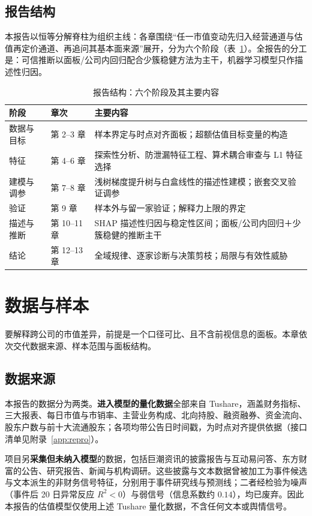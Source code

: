\documentclass[UTF8, a4paper, fontset=none, zihao=-4]{ctexrep}
\begin{document}
\section{报告结构}
本报告以恒等分解脊柱为组织主线：各章围绕“任一市值变动先归入经营通道与估值再定价通道、再追问其基本面来源”展开，分为六个阶段（表~\ref{tab:roadmap}）。全报告的分工是：可信推断以面板/公司内回归配合少簇稳健方法为主干，机器学习模型只作描述性归因。

\begin{table}[htbp]
\caption{报告结构：六个阶段及其主要内容}
\label{tab:roadmap}
\renewcommand{\arraystretch}{1.35}
\begin{tabularx}{\textwidth}{@{}l l X@{}}
\toprule
\textbf{\color{brandblue}阶段} & \textbf{\color{brandblue}章次} & \textbf{\color{brandblue}主要内容} \\
\midrule
数据与目标 & 第 2--3 章 & 样本界定与时点对齐面板；超额估值目标变量的构造 \\
特征 & 第 4--6 章 & 探索性分析、防泄漏特征工程、算术耦合审查与 L1 特征选择 \\
建模与调参 & 第 7--8 章 & 浅树梯度提升树与白盒线性的描述性建模；嵌套交叉验证调参 \\
验证 & 第 9 章 & 样本外与留一家验证；解释力上限的界定 \\
描述与推断 & 第 10--11 章 & SHAP 描述性归因与稳定性区间；面板/公司内回归＋少簇稳健的推断主干 \\
结论 & 第 12--13 章 & 全域规律、逐家诊断与决策剪枝；局限与有效性威胁 \\
\bottomrule
\end{tabularx}
\end{table}

\chapter{数据与样本}\label{ch:data}
要解释跨公司的市值差异，前提是一个口径可比、且不含前视信息的面板。本章依次交代数据来源、样本范围与面板结构。

\section{数据来源}
本报告的数据分为两类。\textbf{进入模型的量化数据}全部来自 Tushare，涵盖财务指标、三大报表、每日市值与市销率、主营业务构成、北向持股、融资融券、资金流向、股东户数与前十大流通股东；各项均带公告日时间戳，为时点对齐提供依据（接口清单见附录~\ref{app:repro}）。

项目另\textbf{采集但未纳入模型}的数据，包括巨潮资讯的披露报告与互动易问答、东方财富的公告、研究报告、新闻与机构调研。这些披露与文本数据曾被加工为事件候选与文本派生的非财务信号特征，分别用于事件研究线与预测线；二者经检验为噪声（事件后 20 日异常反应 $R^2<0$）与弱信号（信息系数约 $0.14$），均已废弃。因此本报告的估值模型仅使用上述 Tushare 量化数据，不含任何文本或舆情信号。
\end{document}
